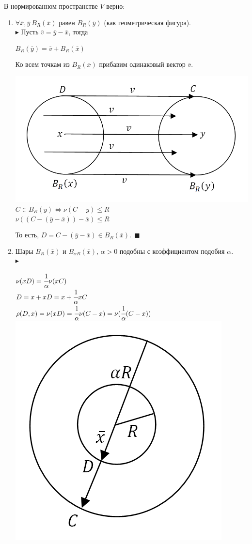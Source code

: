\documentclass[12pt]{article}
\theoremstyle{definition}
\numberwithin{equation}{section}
\begin{document}
В нормированном пространстве $V$ верно:\begin{enumerate}
\item $\forall \bar x, \bar y ~B_R(\bar x)$ равен $B_R(\bar y)$ (как геометрическая фигура).\\ 
$\blacktriangleright$ Пусть $\bar v = \bar y - \bar x$, тогда \begin{center} $B_R(\bar y) = \bar v + B_R(\bar x)$\end{center}
Ко всем точкам из $B_R(\bar x)$ прибавим одинаковый вектор $\bar v$.\begin{center}
\includegraphics[scale=0.5]{l4_9.png}\\
$C \in B_R(y) \Leftrightarrow \nu(C-y) \leqslant R$\\
$\nu((C-(\bar y - \bar x))-\bar x) \leqslant R$\end{center}
То есть, $D = C-(\bar y-\bar x) \in B_R(\bar x). ~~\blacksquare$
\item Шары $B_R(\bar x)$ и $ B_{\alpha R}(\bar x)$, $\alpha > 0$ подобны с коэффициентом подобия $\alpha$.\\ 
$\blacktriangleright$ \begin{center}$\nu(x D) = \cfrac{1}{\alpha}\nu(x C)$\\
$D = x+xD = x+\cfrac{1}{\alpha}xC$\\
$\rho(D, x) = \nu(x D) = \cfrac{1}{\alpha}\nu(C-x) = \nu(\cfrac{1}{\alpha}(C-x))$\\
\includegraphics[scale=0.5]{l4_10.png}\\

\end{center}
\end{enumerate}
\end{document}
